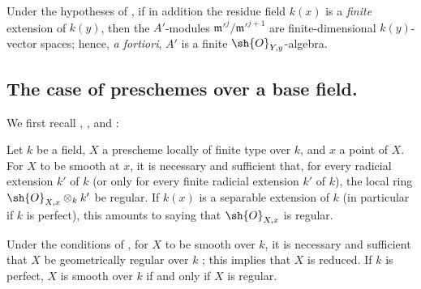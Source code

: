 \begin{remark}[17.14.3]
\label{IV.17.14.3}
Under the hypotheses of , if in addition the residue field $k(x)$ is a \emph{finite} extension of $k(y)$, then the $A'$-modules $\mathfrak m'^j/\mathfrak m'^{j+1}$ are finite-dimensional $k(y)$-vector spaces; hence, \emph{a fortiori}, $A'$ is a finite $\sh{O}_{Y,y}$-algebra.
\end{remark}


\subsection{The case of preschemes over a base field.}
\label{subsection:IV.17.15}

We first recall , , and :

\begin{proposition}[17.15.1]
\label{IV.17.15.1}
Let $k$ be a field, $X$ a prescheme locally of finite type over $k$, and $x$ a point of $X$.
For $X$ to be smooth at $x$, it is necessary and sufficient that, for every radicial extension $k'$ of $k$ (or only for every finite radicial extension $k'$ of $k$), the local ring $\sh{O}_{X,x}\otimes_k k'$ be regular.
If $k(x)$ is a separable extension of $k$ (in particular if $k$ is perfect), this amounts to saying that $\sh{O}_{X,x}$ is regular.
\end{proposition}

\begin{corollary}[17.15.2]
\label{IV.17.15.2}
Under the conditions of , for $X$ to be smooth over $k$, it is necessary and sufficient that $X$ be geometrically regular over $k$ ; this implies that $X$ is reduced.
If $k$ is perfect, $X$ is smooth over $k$ if and only if $X$ is regular.
\end{corollary}

